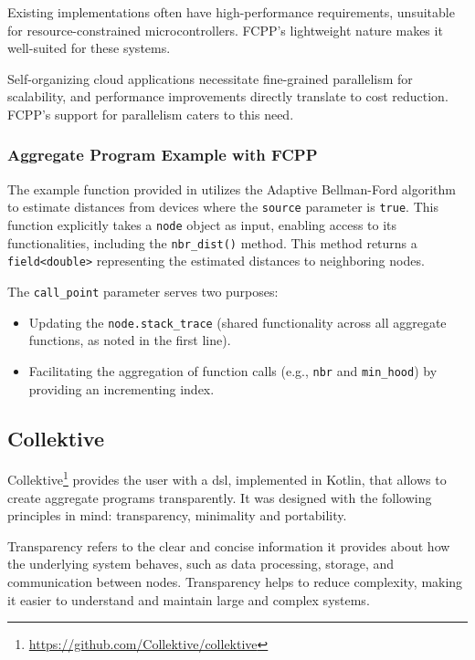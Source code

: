 Existing implementations often have high-performance requirements, unsuitable for resource-constrained microcontrollers. FCPP's lightweight nature makes it well-suited for these systems.

Self-organizing cloud applications necessitate fine-grained parallelism for scalability, and performance improvements directly translate to cost reduction. FCPP's support for parallelism caters to this need.

\subsubsection{Aggregate Program Example with FCPP}

The example function provided in  utilizes the Adaptive Bellman-Ford algorithm to estimate distances from devices where the \texttt{source} parameter is \texttt{true}. This function explicitly takes a \texttt{node} object as input, enabling access to its functionalities, including the \texttt{nbr\_dist()} method. This method returns a \texttt{field<double>} representing the estimated distances to neighboring nodes.

The \texttt{call\_point} parameter serves two purposes:

\begin{itemize}
    \item Updating the \texttt{node.stack\_trace} (shared functionality across all aggregate functions, as noted in the first line).
    \item Facilitating the aggregation of function calls (e.g., \texttt{nbr} and \texttt{min\_hood}) by providing an incrementing index.
\end{itemize}



\subsection{Collektive}

Collektive\footnote{\url{https://github.com/Collektive/collektive}} provides the user with a \ac{dsl}, implemented in Kotlin, that allows to create aggregate programs transparently. It was designed with the following principles in mind: transparency, minimality and portability.

Transparency refers to the clear and concise information it provides about how the underlying system behaves, such as data processing, storage, and communication between nodes. Transparency helps to reduce complexity, making it easier to understand and maintain large and complex systems.

